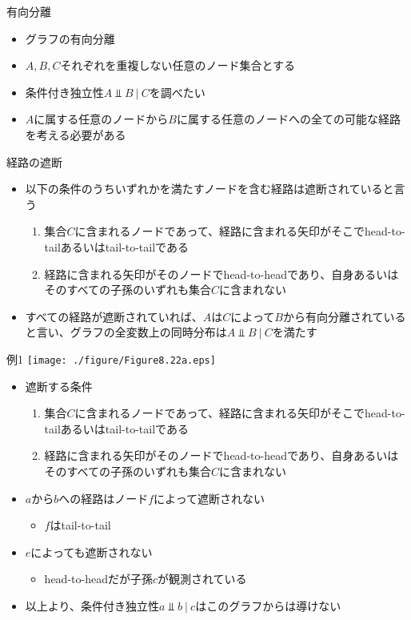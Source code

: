 \begin{frame}{有向分離}
 \begin{itemize}
  \item グラフの有向分離
  \item $A,B,C$それぞれを重複しない任意のノード集合とする
  \item 条件付き独立性$A\Perp B\ | \ C$を調べたい
  \item $A$に属する任意のノードから$B$に属する任意のノードへの全ての可能な経路を考える必要がある
 \end{itemize}
\end{frame}

\begin{frame}{経路の遮断}
 \begin{itemize}
  \item 以下の条件のうちいずれかを満たすノードを含む経路は遮断されていると言う
        \begin{enumerate}
         \item 集合$C$に含まれるノードであって、経路に含まれる矢印がそこでhead-to-tailあるいはtail-to-tailである
         \item 経路に含まれる矢印がそのノードでhead-to-headであり、自身あるいはそのすべての子孫のいずれも集合$C$に含まれない
        \end{enumerate}
  \item すべての経路が遮断されていれば、$A$は$C$によって$B$から有向分離されていると言い、グラフの全変数上の同時分布は$A \Perp B\ | \ C$を満たす
 \end{itemize}
\end{frame}

\begin{frame}{例1}
 \texttt{[image: ./figure/Figure8.22a.eps]}
 \begin{itemize}
  \item 遮断する条件
        \begin{enumerate}
         \item 集合$C$に含まれるノードであって、経路に含まれる矢印がそこでhead-to-tailあるいはtail-to-tailである
         \item 経路に含まれる矢印がそのノードでhead-to-headであり、自身あるいはそのすべての子孫のいずれも集合$C$に含まれない
        \end{enumerate}
  \item $a$から$b$への経路はノード$f$によって遮断されない
        \begin{itemize}
         \item $f$はtail-to-tail
        \end{itemize}
  \item $e$によっても遮断されない
        \begin{itemize}
         \item head-to-headだが子孫$c$が観測されている
        \end{itemize}
  \item 以上より、条件付き独立性$a \Perp b\ | \ c$はこのグラフからは導けない
 \end{itemize}
\end{frame}

